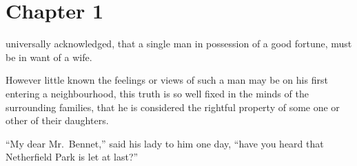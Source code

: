 % 
% 
% 
% 
% 
% 
% 
% 
% 
% 
% 
% 
% 
% 
% 

%
%










\chapter{Chapter 1}


 universally acknowledged, that a single man in
possession of a good fortune, must be in want of a wife.

However little known the feelings or views of such a man may
be on his first entering a neighbourhood, this truth is so well
fixed in the minds of the surrounding families, that he is considered
the rightful property of some one or other of their daughters.

``My dear Mr.\ Bennet,'' said his lady to him one day, ``have you
heard that Netherfield Park is let at last?''


